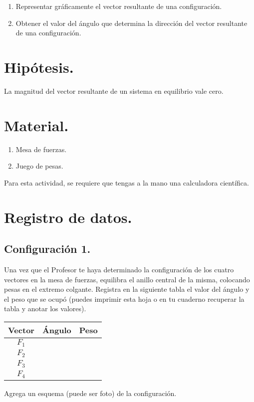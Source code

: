 \documentclass[14pt]{extarticle}
\begin{document}
\begin{enumerate}
\item Representar gráficamente el vector resultante de una configuración.
\item Obtener el valor del ángulo que determina la dirección del vector resultante de una configuración.
\end{enumerate}

\section{Hipótesis.}

La magnitud del vector resultante de un sistema en equilibrio vale cero.

\section{Material.}

\begin{enumerate}
\itemsep0.15em 
\item Mesa de fuerzas.
\item Juego de pesas.
\end{enumerate}
Para esta actividad, se requiere que tengas a la mano una calculadora científica.

\section{Registro de datos.}

\subsection{Configuración 1.}

Una vez que el Profesor te haya determinado la configuración de los cuatro vectores en la mesa de fuerzas, equilibra el anillo central de la misma, colocando pesas en el extremo colgante. Registra en la siguiente tabla el valor del ángulo y el peso que se ocupó (puedes imprimir esta hoja o en tu cuaderno recuperar la tabla y anotar los valores).
\begin{table}[H]
\centering
\begin{tabular}{| c | p{3cm} | p{3cm} |} \hline
\textbf{Vector} & \multicolumn{1}{c|}{\textbf{Ángulo}} & \multicolumn{1}{c|}{\textbf{Peso}} \\ \hline
$F_{1}$ & & \\ \hline
$F_{2}$ & & \\ \hline
$F_{3}$ & & \\ \hline
$F_{4}$ & & \\ \hline
\end{tabular}
\end{table}
Agrega un esquema (puede ser foto) de la configuración.
\end{document}

